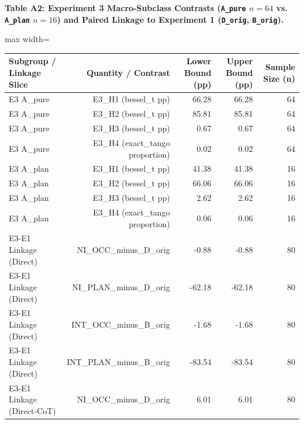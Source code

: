 \documentclass[11pt,a4paper]{article}
\begin{document}
\textbf{Table A2: Experiment 3 Macro-Subclass Contrasts (\texttt{A\_\allowbreak{}pure} $n=64$ vs. \texttt{A\_\allowbreak{}plan} $n=16$) and Paired Linkage to Experiment 1 (\texttt{D\_\allowbreak{}orig}, \texttt{B\_\allowbreak{}orig}).}

\begin{center}\begingroup\small\setlength{\tabcolsep}{4.5pt}\renewcommand{\arraystretch}{1.12}\begin{adjustbox}{max width=\textwidth}\begin{tabular}{lrrrr}\toprule
\textbf{Subgroup / Linkage Slice} & \textbf{Quantity / Contrast} & \textbf{Lower Bound (pp)} & \textbf{Upper Bound (pp)} & \textbf{Sample Size (n)} \\ \midrule
E3 A\_\allowbreak{}pure & E3\_\allowbreak{}H1 (bessel\_\allowbreak{}t pp) & 66.28 & 66.28 & 64 \\
E3 A\_\allowbreak{}pure & E3\_\allowbreak{}H2 (bessel\_\allowbreak{}t pp) & 85.81 & 85.81 & 64 \\
E3 A\_\allowbreak{}pure & E3\_\allowbreak{}H3 (bessel\_\allowbreak{}t pp) & 0.67 & 0.67 & 64 \\
E3 A\_\allowbreak{}pure & E3\_\allowbreak{}H4 (exact\_\allowbreak{}tango proportion) & 0.02 & 0.02 & 64 \\
E3 A\_\allowbreak{}plan & E3\_\allowbreak{}H1 (bessel\_\allowbreak{}t pp) & 41.38 & 41.38 & 16 \\
E3 A\_\allowbreak{}plan & E3\_\allowbreak{}H2 (bessel\_\allowbreak{}t pp) & 66.06 & 66.06 & 16 \\
E3 A\_\allowbreak{}plan & E3\_\allowbreak{}H3 (bessel\_\allowbreak{}t pp) & 2.62 & 2.62 & 16 \\
E3 A\_\allowbreak{}plan & E3\_\allowbreak{}H4 (exact\_\allowbreak{}tango proportion) & 0.06 & 0.06 & 16 \\
E3-E1 Linkage (Direct) & NI\_\allowbreak{}OCC\_\allowbreak{}minus\_\allowbreak{}D\_\allowbreak{}orig & -0.88 & -0.88 & 80 \\
E3-E1 Linkage (Direct) & NI\_\allowbreak{}PLAN\_\allowbreak{}minus\_\allowbreak{}D\_\allowbreak{}orig & -62.18 & -62.18 & 80 \\
E3-E1 Linkage (Direct) & INT\_\allowbreak{}OCC\_\allowbreak{}minus\_\allowbreak{}B\_\allowbreak{}orig & -1.68 & -1.68 & 80 \\
E3-E1 Linkage (Direct) & INT\_\allowbreak{}PLAN\_\allowbreak{}minus\_\allowbreak{}B\_\allowbreak{}orig & -83.54 & -83.54 & 80 \\
E3-E1 Linkage (Direct-CoT) & NI\_\allowbreak{}OCC\_\allowbreak{}minus\_\allowbreak{}D\_\allowbreak{}orig & 6.01 & 6.01 & 80 \\

\end{tabular}
\end{adjustbox}
\end{center}
\end{document}
